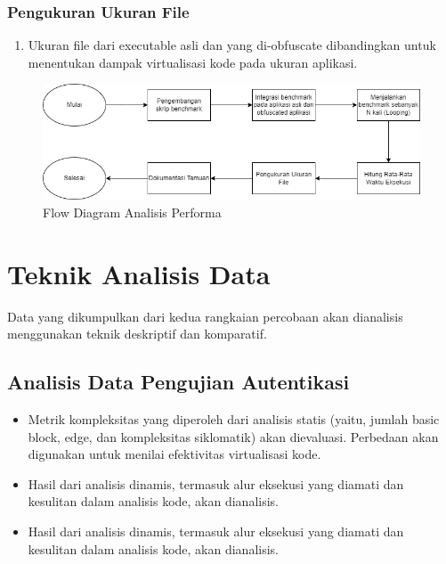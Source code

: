 \subsubsection{Pengukuran Ukuran File}
\begin{enumerate}
	\item {} Ukuran file dari executable asli dan yang di-obfuscate dibandingkan untuk menentukan dampak virtualisasi kode pada ukuran aplikasi.
\end{enumerate}

\begin{figure}
	\centering
	\includegraphics[width=1\textwidth]
	{assets/pics/Performance.png}
	\caption{Flow Diagram Analisis Performa}
\end{figure}

\section{Teknik Analisis Data}
Data yang dikumpulkan dari kedua rangkaian percobaan akan dianalisis menggunakan teknik deskriptif dan komparatif.
\subsection{Analisis Data Pengujian Autentikasi}
\begin{itemize}
	\item {} Metrik kompleksitas yang diperoleh dari analisis statis (yaitu, jumlah basic block, edge, dan kompleksitas siklomatik) akan dievaluasi. Perbedaan akan digunakan untuk menilai efektivitas virtualisasi kode.
	\item {} Hasil dari analisis dinamis, termasuk alur eksekusi yang diamati dan kesulitan dalam analisis kode, akan dianalisis.
	\item {} Hasil dari analisis dinamis, termasuk alur eksekusi yang diamati dan kesulitan dalam analisis kode, akan dianalisis.
\end{itemize}

